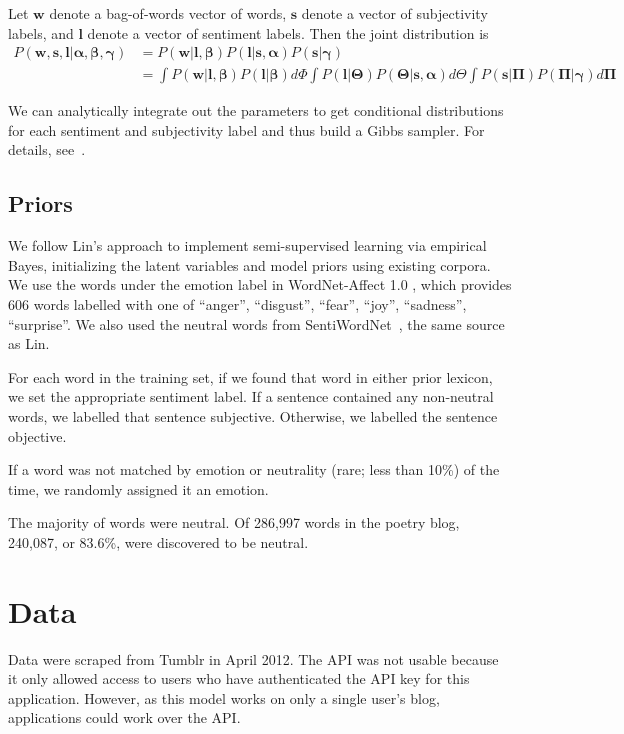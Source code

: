 \documentclass{article}
\begin{document}
Let $\mathbf{w}$ denote a bag-of-words vector of words, $\mathbf{s}$
denote a vector of subjectivity labels, and $\mathbf{l}$ denote a vector
of sentiment labels. Then the joint distribution is
\begin{equation}
\begin{aligned}
P(\mathbf{w,s,l}|\mathbf{\alpha,\beta,\gamma}) &= P(\mathbf{w}|\mathbf{l,\beta})P(\mathbf{l}|\mathbf{s,\alpha})P(\mathbf{s}|\mathbf{\gamma}) \\
    &= \int P(\mathbf{w}|\mathbf{l,\beta})P(\mathbf{l}|\mathbf{\beta}) d\Phi \int P(\mathbf{l}|\mathbf{\Theta})P(\mathbf{\Theta}|\mathbf{s,\alpha})d\Theta \int P(\mathbf{s}|\mathbf{\Pi})P(\mathbf{\Pi}|\mathbf{\gamma}) d\mathbf{\Pi}
\end{aligned}
\end{equation}

We can analytically integrate out the parameters to get conditional
distributions for each sentiment and subjectivity label and thus
build a Gibbs sampler. For details, see~\citep{lin03}.

\subsection{Priors}
We follow Lin's approach to implement semi-supervised learning via
empirical Bayes, initializing the latent variables and model priors
using existing corpora. We use the words under the {\sc emotion}
label in WordNet-Affect 1.0 \citep{strapparava04}, which provides
606 words labelled with one of ``anger'', ``disgust'', ``fear'',
``joy'', ``sadness'', ``surprise''. We also used the neutral words
from SentiWordNet~\citep{baccianella10}, the same source as Lin.

For each word in the training set, if we found that word in either
prior lexicon, we set the appropriate sentiment label. If a sentence
contained any non-neutral words, we labelled that sentence subjective.
Otherwise, we labelled the sentence objective.

If a word was not matched by emotion or neutrality (rare; less than
10\%) of the time, we randomly assigned it an emotion.

The majority of words were neutral. Of 286,997 words in the 
poetry blog, 240,087, or 83.6\%, were discovered to be neutral.

\section{Data}
Data were scraped from Tumblr in April 2012. The API
was not usable because it only allowed access to users who have
authenticated the API key for this application. However, as this
model works on only a single user's blog, applications could work
over the API.
\end{document}
